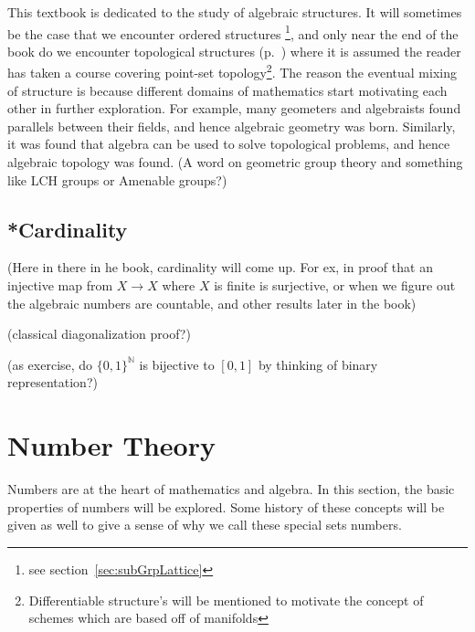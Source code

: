 \documentclass{book}
\newcommand{\N}{{\mathbb{N}}}
\newcommand{\rw}{\rightarrow}
\begin{document}
This textbook is dedicated to the study of algebraic structures. It will sometimes be the case that we encounter ordered
structures \footnote{see section~\ref{sec:subGrpLattice}}, and only near the end of the book do we encounter topological
structures (p.~\pageref{df:zariskiTop}) where it is assumed the reader has taken a course covering point-set
topology\footnote{Differentiable structure's will be mentioned to motivate the concept of schemes which are based off
of manifolds}. The reason the eventual mixing of structure is because different domains of mathematics start motivating
each other in further exploration. For example, many geometers and algebraists found parallels between their fields,
and hence algebraic geometry was born. Similarly, it was found that algebra can be used to solve topological problems,
and hence algebraic topology was found. (A word on geometric group theory and something like LCH groups or Amenable
groups?)

\subsection{*Cardinality}

(Here in there in he book, cardinality will come up. For ex, in proof that an injective map from $X \rw X$ where $X$
is finite is surjective, or when we figure out the algebraic numbers are countable, and other results later in the
book)

(classical diagonalization proof?)

(as exercise, do $\{0,1\}^\N$ is bijective to $[0,1]$ by thinking of binary representation?)
\newpage
\section{Number Theory}\label{sec:numbTheory}

Numbers are at the heart of mathematics and algebra. In this section, the basic properties of numbers will be
explored. Some history of these concepts will be given as well to give a sense of why we call these special sets numbers.
\end{document}
